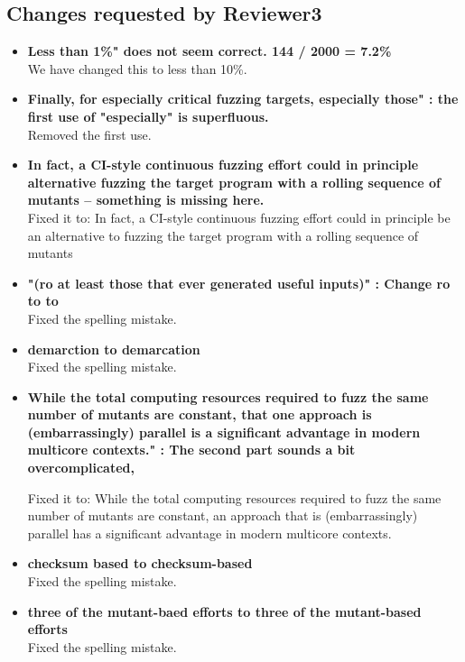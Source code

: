 \documentclass[11pt]{article}
\begin{document}
\subsection{Changes requested by Reviewer3}
\begin{itemize}
\item \textbf{Less than 1\%" does not seem correct. 144 / 2000 = 7.2\%}\\
We have changed this to less than 10\%.

\item \textbf{Finally, for especially critical fuzzing targets, especially
those" : the first use of "especially" is superfluous.}\\
Removed the first use.

\item \textbf{In fact, a CI-style continuous fuzzing effort could in principle
alternative fuzzing the target program with a rolling sequence of mutants --
something is missing here.}\\
Fixed it to: In fact, a CI-style continuous fuzzing effort could in principle be
an alternative to fuzzing the target program with a rolling sequence of mutants

\item \textbf{"(ro at least those that ever generated useful inputs)" : Change
ro to to} \\
Fixed the spelling mistake.

\item \textbf{demarction to demarcation}\\
Fixed the spelling mistake.

\item \textbf{While the total computing resources required to fuzz the same
number of mutants are constant, that one approach is (embarrassingly) parallel
is a significant advantage in modern multicore contexts." : The second part
sounds a bit overcomplicated,}

Fixed it to: While the total computing resources required to fuzz the same
number of mutants are constant, an approach that is (embarrassingly) parallel
has a significant advantage in modern multicore contexts.                                          

\item \textbf{checksum based to checksum-based}\\
Fixed the spelling mistake.

\item \textbf{three of the mutant-baed efforts to three of the mutant-based
efforts}\\
Fixed the spelling mistake.

\end{itemize}
\end{document}
